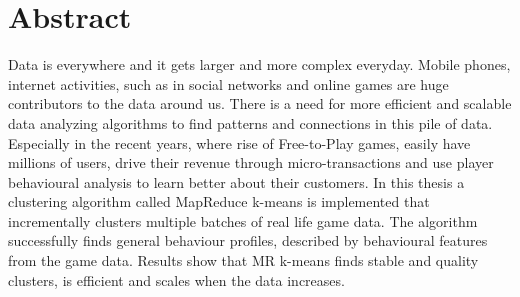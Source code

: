 \documentclass[a4paper, 11pt, oneside]{Thesis}  %
\numberwithin{algorithm}{chapter}
\begin{document}
\chapter*{Abstract}
\thispagestyle{plain}

Data is everywhere and it gets larger and more complex everyday. Mobile phones, internet activities, such as in social networks and online games are huge contributors to the data around us. There is a need for more efficient and scalable data analyzing algorithms to find patterns and connections in this pile of data. Especially in the recent years, where rise of Free-to-Play games, easily have millions of users, drive their revenue through micro-transactions and use player behavioural analysis to learn better about their customers. In this thesis a clustering algorithm called MapReduce k-means is implemented that incrementally clusters multiple batches of real life game data. The algorithm successfully finds general behaviour profiles, described by behavioural features from the game data. Results show that MR k-means finds stable and quality clusters, is efficient and scales when the data increases.


\clearpage  %


\clearpage  %

\pagestyle{fancy}  %


\tableofcontents  %
\end{document}
